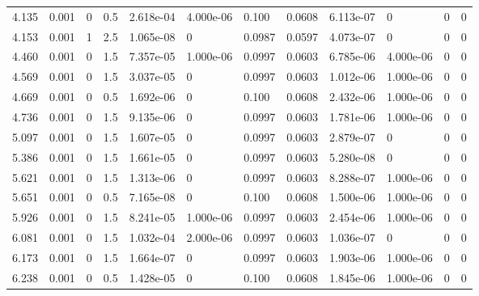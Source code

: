 \documentclass[preview]{standalone}
\begin{document}
{{\begin{tabular}{L{1.2cm}C{1.2cm} C{0.3cm}C{0.5cm} C{1.4cm}C{1.4cm} C{1.4cm}C{1.4cm} C{1.6cm}C{1.6cm} C{1.6cm}C{1.6cm}}
  4.135  &  0.001  & 0     & 0.5 &  2.618e-04  & 4.000e-06  &  0.100&   0.0608& 6.113e-07 & 0   &  0 & 0  \\ 
  4.153  &  0.001  & 1     & 2.5 &  1.065e-08  & 0  &  0.0987&   0.0597& 4.073e-07 & 0   &  0 & 0  \\ 
  4.460  &  0.001  & 0     & 1.5 &  7.357e-05  & 1.000e-06  &  0.0997&   0.0603& 6.785e-06 & 4.000e-06   &  0 & 0  \\ 
  4.569  &  0.001  & 0     & 1.5 &  3.037e-05  & 0  &  0.0997&   0.0603& 1.012e-06 & 1.000e-06   &  0 & 0  \\ 
  4.669  &  0.001  & 0     & 0.5 &  1.692e-06  & 0  &  0.100&   0.0608& 2.432e-06 & 1.000e-06   &  0 & 0  \\ 
  4.736  &  0.001  & 0     & 1.5 &  9.135e-06  & 0  &  0.0997&   0.0603& 1.781e-06 & 1.000e-06   &  0 & 0  \\ 
  5.097  &  0.001  & 0     & 1.5 &  1.607e-05  & 0  &  0.0997&   0.0603& 2.879e-07 & 0   &  0 & 0  \\ 
  5.386  &  0.001  & 0     & 1.5 &  1.661e-05  & 0  &  0.0997&   0.0603& 5.280e-08 & 0   &  0 & 0  \\ 
  5.621  &  0.001  & 0     & 1.5 &  1.313e-06  & 0  &  0.0997&   0.0603& 8.288e-07 & 1.000e-06   &  0 & 0  \\ 
  5.651  &  0.001  & 0     & 0.5 &  7.165e-08  & 0  &  0.100&   0.0608& 1.500e-06 & 1.000e-06   &  0 & 0  \\ 
  5.926  &  0.001  & 0     & 1.5 &  8.241e-05  & 1.000e-06  &  0.0997&   0.0603& 2.454e-06 & 1.000e-06   &  0 & 0  \\ 
  6.081  &  0.001  & 0     & 1.5 &  1.032e-04  & 2.000e-06  &  0.0997&   0.0603& 1.036e-07 & 0   &  0 & 0  \\ 
  6.173  &  0.001  & 0     & 1.5 &  1.664e-07  & 0  &  0.0997&   0.0603& 1.903e-06 & 1.000e-06   &  0 & 0  \\ 
  6.238  &  0.001  & 0     & 0.5 &  1.428e-05  & 0  &  0.100&   0.0608& 1.845e-06 & 1.000e-06   &  0 & 0  \\ 
\hline 
\end{tabular} 

}}
\end{document}
